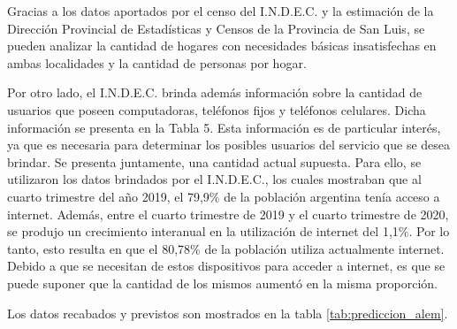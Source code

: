 \documentclass[11pt,a4paper]{article}
\begin{document}
\begin{table}[htbp]
    \caption{cantidad de habitantes en el año 2.010 y previstos para julio del 2.021 en la localidad de Leandro N. Alem.}
  \label{tab:habitantes_futur_alem}%
\end{table}%


Gracias a los datos aportados por el censo del I.N.D.E.C. y la estimación de la Dirección Provincial de Estadísticas y Censos de la Provincia de San Luis, se pueden analizar la cantidad de hogares con necesidades básicas insatisfechas en ambas localidades y la cantidad de personas por hogar.

Por otro lado, el I.N.D.E.C. brinda además información sobre la cantidad de usuarios que poseen computadoras, teléfonos fijos y teléfonos celulares. 
Dicha información se presenta en la Tabla 5.
Esta información es de particular interés, ya que es necesaria para determinar los posibles usuarios del servicio que se desea brindar.
Se presenta juntamente, una cantidad actual supuesta.
Para ello, se utilizaron los datos brindados por el I.N.D.E.C., los cuales mostraban que al cuarto trimestre del año 2019, el 79,9$\%$ de la población argentina tenía acceso a internet.
Además, entre el cuarto trimestre de 2019 y el cuarto trimestre de 2020, se produjo un crecimiento interanual en la utilización de internet del 1,1$\%$.
Por lo tanto, esto resulta en que el 80,78$\%$ de la población utiliza actualmente internet.
Debido a que se necesitan de estos dispositivos para acceder a internet, es que se puede suponer que la cantidad de los mismos aumentó en la misma proporción.

Los datos recabados y previstos son mostrados en la tabla \ref{tab:prediccion_alem}.
\end{document}
